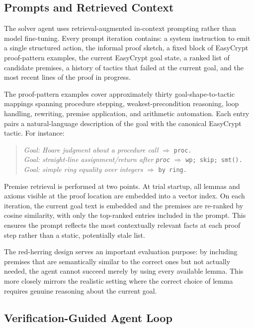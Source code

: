 \documentclass[acmsmall,natbib=false]{acmart}
\begin{document}
\subsection{Prompts and Retrieved Context}

The solver agent uses retrieval-augmented in-context prompting rather than model fine-tuning. Every prompt iteration contains: a system instruction to emit a single structured action, the informal proof sketch, a fixed block of EasyCrypt proof-pattern examples, the current EasyCrypt goal state, a ranked list of candidate premises, a history of tactics that failed at the current goal, and the most recent lines of the proof in progress.

The proof-pattern examples cover approximately thirty goal-shape-to-tactic mappings spanning procedure stepping, weakest-precondition reasoning, loop handling, rewriting, premise application, and arithmetic automation. Each entry pairs a natural-language description of the goal with the canonical EasyCrypt tactic. For instance:

\begin{quote}
\textit{Goal: Hoare judgment about a procedure call} $\Rightarrow$ \texttt{proc.}\\
\textit{Goal: straight-line assignment/return after \texttt{proc}} $\Rightarrow$ \texttt{wp; skip; smt().}\\
\textit{Goal: simple ring equality over integers} $\Rightarrow$ \texttt{by ring.}
\end{quote}

Premise retrieval is performed at two points. At trial startup, all lemmas and axioms visible at the proof location are embedded into a vector index. On each iteration, the current goal text is embedded and the premises are re-ranked by cosine similarity, with only the top-ranked entries included in the prompt. This ensures the prompt reflects the most contextually relevant facts at each proof step rather than a static, potentially stale list.

The red-herring design serves an important evaluation purpose: by including premises that are semantically similar to the correct ones but not actually needed, the agent cannot succeed merely by using every available lemma. This more closely mirrors the realistic setting where the correct choice of lemma requires genuine reasoning about the current goal.

\subsection{Verification-Guided Agent Loop}
\end{document}
